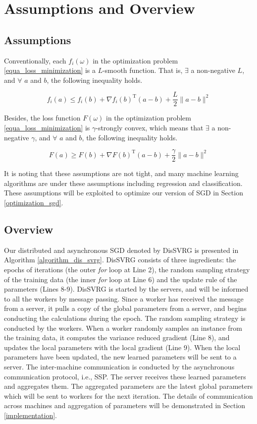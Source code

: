\documentclass[10pt,journal,finalsubmission,compsoc]{IEEEtran}
\begin{document}
\section{Assumptions and Overview}
\label{overview}
\subsection{Assumptions}
Conventionally, each $f_i(\omega)$ in the optimization problem \ref{equa_loss_minimization} is a $L$-smooth function. That is, $\exists$ a non-negative $L$, and $\forall$ $a$ and $b$, the following inequality holds.

\begin{equation}
\label{equa_l_smooth} 
f_i(a)\le f_i(b)+\nabla f_i(b)^\mathrm{T} (a-b)+\frac{L}{2}\parallel a-b\parallel^2
 \end{equation}
 
Besides, the loss function $F(\omega)$  in the optimization problem \ref{equa_loss_minimization} is $\gamma$-strongly convex, which means that $\exists$ a non-negative $\gamma$, and $\forall$ $a$ and $b$, the following inequality holds.

\begin{equation}
\label{equa_gamma_convex} 
F(a)\ge F(b)+\nabla F(b)^\mathrm{T} (a-b)+\frac{\gamma}{2}\parallel a-b\parallel^2
\end{equation}

It is noting that these assumptions are not tight, and many machine learning algorithms are under these assumptions including regression and classification. These assumptions will be exploited to optimize our version of SGD in Section \ref{optimization_sgd}. 

\subsection{Overview}
Our distributed and asynchronous SGD denoted by DisSVRG is presented  in Algorithm \ref{algorithm_dis_svrg}. DisSVRG consists of three ingredients: the epochs of iterations (the outer \emph{for} loop at Line 2), the random sampling strategy of the training data (the inner \emph{for} loop at Line 6) and the update rule of the parameters (Lines 8-9). DisSVRG is started by the servers, and will be informed to all the workers by message passing. Since a worker has received the message from a server, it pulls a copy of the global parameters from a server, and  begins conducting the calculations during the epoch. The random sampling strategy is conducted by the workers. When a worker randomly samples an instance from the training data, it computes the variance reduced gradient (Line 8), and updates the local parameters with the local gradient (Line 9). When the local parameters have been updated, the new learned parameters will be sent to a server. The inter-machine communication is conducted by the asynchronous communication protocol, i.e., SSP. The server receives these learned parameters  and aggregates them. The aggregated parameters are the latest global parameters which will be sent to workers for the next iteration. The details of communication across machines and aggregation of parameters will be demonstrated in Section \ref{implementation}. 
\end{document}
